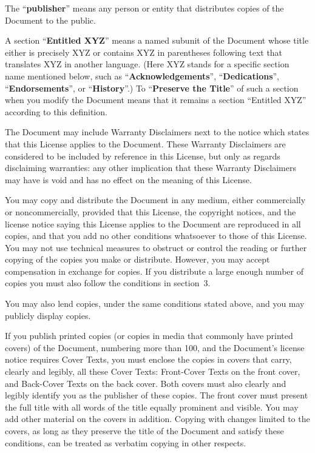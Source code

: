 \documentclass{article}
\begin{document}
The ``\textbf{publisher}'' means any person or entity that distributes
copies of the Document to the public.

A section ``\textbf{Entitled XYZ}'' means a named subunit of the Document whose
title either is precisely XYZ or contains XYZ in parentheses following
text that translates XYZ in another language.  (Here XYZ stands for a
specific section name mentioned below, such as ``\textbf{Acknowledgements}'',
``\textbf{Dedications}'', ``\textbf{Endorsements}'', or ``\textbf{History}''.)  
To ``\textbf{Preserve the Title}''
of such a section when you modify the Document means that it remains a
section ``Entitled XYZ'' according to this definition.

The Document may include Warranty Disclaimers next to the notice which
states that this License applies to the Document.  These Warranty
Disclaimers are considered to be included by reference in this
License, but only as regards disclaiming warranties: any other
implication that these Warranty Disclaimers may have is void and has
no effect on the meaning of this License.



You may copy and distribute the Document in any medium, either
commercially or noncommercially, provided that this License, the
copyright notices, and the license notice saying this License applies
to the Document are reproduced in all copies, and that you add no other
conditions whatsoever to those of this License.  You may not use
technical measures to obstruct or control the reading or further
copying of the copies you make or distribute.  However, you may accept
compensation in exchange for copies.  If you distribute a large enough
number of copies you must also follow the conditions in section~3.

You may also lend copies, under the same conditions stated above, and
you may publicly display copies.



If you publish printed copies (or copies in media that commonly have
printed covers) of the Document, numbering more than 100, and the
Document's license notice requires Cover Texts, you must enclose the
copies in covers that carry, clearly and legibly, all these Cover
Texts: Front-Cover Texts on the front cover, and Back-Cover Texts on
the back cover.  Both covers must also clearly and legibly identify
you as the publisher of these copies.  The front cover must present
the full title with all words of the title equally prominent and
visible.  You may add other material on the covers in addition.
Copying with changes limited to the covers, as long as they preserve
the title of the Document and satisfy these conditions, can be treated
as verbatim copying in other respects.
\end{document}
